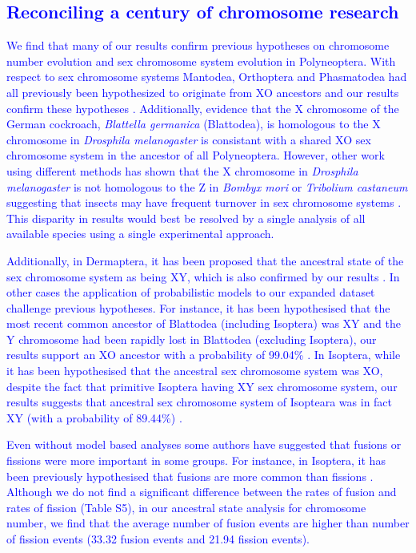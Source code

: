\documentclass[]{rsos}%
\begin{document}
\subsection{\textcolor{blue}{Reconciling a century of chromosome research}}
\textcolor{blue}{We find that many of our results confirm previous hypotheses on chromosome number evolution and sex chromosome system evolution in Polyneoptera.
With respect to sex chromosome systems Mantodea, Orthoptera and Phasmatodea had all previously been hypothesized to originate from XO ancestors and our results confirm these hypotheses \cite{hughes1950chromosomes,blackmon2016, blackman1995sex}. %
\textcolor{blue}{Additionally, evidence that the X chromosome of the German cockroach, \textit{Blattella germanica} (Blattodea), is homologous to the X chromosome in \textit{Drosphila melanogaster} is consistant with a shared XO sex chromosome system in the ancestor of all Polyneoptera\cite{meisel2019x}.}
However, other work using different methods has shown that the X chromosome in \textit{Drosphila melanogaster} is not homologous to the Z in \textit{Bombyx mori} or \textit{Tribolium castaneum} suggesting that insects may have frequent turnover in sex chromosome systems \cite{pease2012}.%
This disparity in results would best be resolved by a single analysis of all available species using a single experimental approach.}

\textcolor{blue}{Additionally, in Dermaptera, it has been proposed that the ancestral state of the sex chromosome system as being XY, which is also confirmed by our results \cite{blackman1995sex}.
In other cases the application of probabilistic models to our expanded dataset challenge previous hypotheses.
For instance, it has been hypothesised that the most recent common ancestor of Blattodea (including Isoptera) was XY and the Y chromosome had been rapidly lost in Blattodea (excluding Isoptera), our results support an XO ancestor with a probability of 99.04\% \cite{luykx1990cytogenetic, bergamaschi2007karyology}.
In Isoptera, while it has been hypothesised that the ancestral sex chromosome system was XO, despite the fact that primitive Isoptera having XY sex chromosome system, our results suggests that ancestral sex chromosome system of Isopteara was in fact XY (with a probability of 89.44\%) \cite{luykx1990cytogenetic,blackman1995sex}.}
 
\textcolor{blue}{Even without model based analyses some authors have suggested that fusions or fissions were more important in some groups.
For instance, in Isoptera, it has been previously hypothesised that fusions are more common than fissions \cite{luykx1990cytogenetic,bergamaschi2007karyology}.
Although we do not find a significant difference between the rates of fusion and rates of fission (Table S5), in our ancestral state analysis for chromosome number, we find that the average number of fusion events are higher than number of fission events (33.32 fusion events and 21.94 fission events).} %
\end{document}
